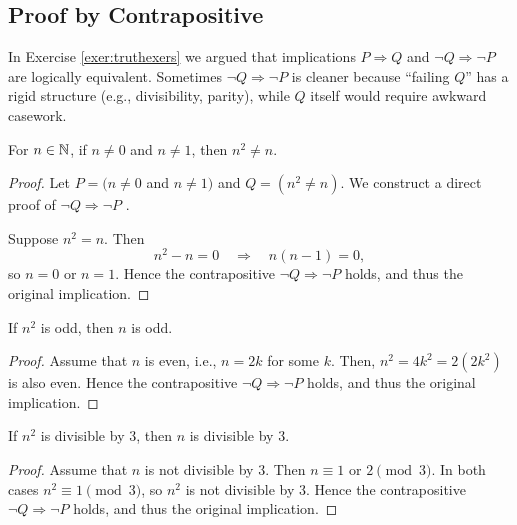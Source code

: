 \subsection{Proof by Contrapositive}
In Exercise \ref{exer:truthexers} we argued that  implications \(P\Rightarrow Q\) and \(\neg Q \Rightarrow \neg P\) are logically equivalent. Sometimes \(\neg Q \Rightarrow \neg P\) is cleaner because “failing \(Q\)” has a rigid structure (e.g., divisibility, parity), while \(Q\) itself would require awkward casework.

\begin{theorem}
\label{thm:contrapositiveisbetter}
For $n \in \mathbb{N}$, if $n \neq 0$ and $n \neq 1$, then $n^2 \neq n$.
\end{theorem}

\begin{proof}
Let $P = (n \neq 0$ and $n \neq 1)$ and $Q = (n^2 \neq n)$. We construct a direct proof of \(\neg Q \Rightarrow \neg P\) .

Suppose $n^2 = n$. Then
\[
n^2 - n = 0 \quad \Longrightarrow \quad n(n-1) = 0, 
\]
so $n = 0$ or $n = 1$. Hence the contrapositive \(\neg Q\Rightarrow \neg P\) holds, and thus the original implication.
\end{proof}


\begin{theorem}
If $n^2$ is odd, then $n$ is odd.
\end{theorem}
\begin{proof}
Assume that $n$ is even, i.e., $n = 2k$ for some $k$. Then, $n^2 = 4k^2 = 2(2k^2)$ is also even. Hence the contrapositive \(\neg Q\Rightarrow \neg P\) holds, and thus the original implication.
\end{proof}

\begin{theorem}\label{thm:div3}
If \(n^2\) is divisible by \(3\), then \(n\) is divisible by \(3\).
\end{theorem}
\begin{proof}
Assume that $n$ is not divisible by 3. Then \(n\equiv 1\) or \(2 \pmod{3}\). In both cases \(n^2\equiv 1\pmod{3}\), so $n^2$ is not divisible by 3. Hence the contrapositive \(\neg Q\Rightarrow \neg P\) holds, and thus the original implication.
\end{proof}

